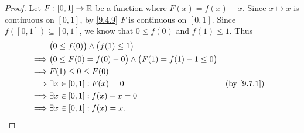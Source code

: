\begin{proof}
  Let \(F : [0, 1] \to \mathbb{R}\) be a function where \(F(x) = f(x) - x\).
  Since \(x \mapsto x\) is continuous on \([0, 1]\), by \cref{9.4.9} \(F\) is continuous on \([0, 1]\).
  Since \(f([0, 1]) \subseteq [0, 1]\), we know that \(0 \leq f(0)\) and \(f(1) \leq 1\).
  Thus
  \begin{align*}
             & \big(0 \leq f(0)\big) \land \big(f(1) \leq 1\big)                                       \\
    \implies & \big(0 \leq F(0) = f(0) - 0\big) \land \big(F(1) = f(1) - 1 \leq 0\big)                 \\
    \implies & F(1) \leq 0 \leq F(0)                                                                   \\
    \implies & \exists x \in [0, 1] : F(x) = 0                                         &  & \by{9.7.1} \\
    \implies & \exists x \in [0, 1] : f(x) - x = 0                                                     \\
    \implies & \exists x \in [0, 1] : f(x) = x.
  \end{align*}
\end{proof}